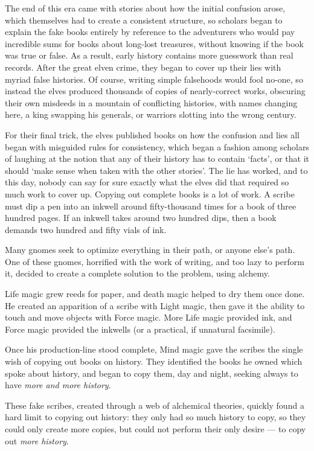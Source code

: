 \begin{multicols}{2}
\begin{exampletext}
    The end of this era came with stories about how the initial confusion arose, which themselves had to create a consistent structure, so scholars began to explain the fake books entirely by reference to the adventurers who would pay incredible sums for books about long-lost treasures, without knowing if the book was true or false.
    As a result, early history contains more guesswork than real records.
  \or
    After the great elven crime, they began to cover up their lies with myriad false histories.
    Of course, writing simple falsehoods would fool no-one, so instead the elves produced thousands of copies of nearly-correct works, obscuring their own misdeeds in a mountain of conflicting histories, with names changing here, a king swapping his generals, or warriors slotting into the wrong century.

    For their final trick, the elves published books on how the confusion and lies all began with misguided rules for consistency, which began a fashion among scholars of laughing at the notion that any of their history has to contain `facts', or that it should `make sense when taken with the other stories'.
    The lie has worked, and to this day, nobody can say for sure exactly what the elves did that required so much work to cover up.
  \or
    Copying out complete books is a lot of work.
    A scribe must dip a pen into an inkwell around fifty-thousand times for a book of three hundred pages.
    If an inkwell takes around two hundred dips, then a book demands two hundred and fifty vials of ink.

    Many gnomes seek to optimize everything in their path, or anyone else's path.
    One of these gnomes, horrified with the work of writing, and too lazy to perform it, decided to create a complete solution to the problem, using alchemy.

    Life magic grew reeds for paper, and death magic helped to dry them once done.
    He created an apparition of a scribe with Light magic, then gave it the ability to touch and move objects with Force magic.
    More Life magic provided ink, and Force magic provided the inkwells (or a practical, if unnatural facsimile).

    Once his production-line stood complete, Mind magic gave the scribes the single wish of copying out books on history.
    They identified the books he owned which spoke about history, and began to copy them, day and night, seeking always to have \emph{more and more history}.

    These fake scribes, created through a web of alchemical theories, quickly found a hard limit to copying out history: they only had so much history to copy, so they could only create more copies, but could not perform their only desire --- to copy out \emph{more history}.


\end{exampletext}
\end{multicols}
